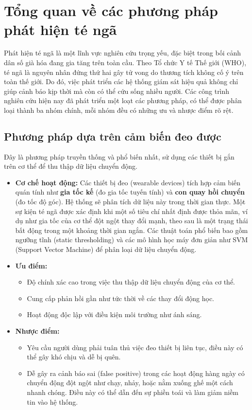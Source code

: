
\section{Tổng quan về các phương pháp phát hiện té ngã}

Phát hiện té ngã là một lĩnh vực nghiên cứu trọng yếu, đặc biệt trong bối cảnh dân số già hóa đang gia tăng trên toàn cầu. Theo Tổ chức Y tế Thế giới (WHO), té ngã là nguyên nhân đứng thứ hai gây tử vong do thương tích không cố ý trên toàn thế giới. Do đó, việc phát triển các hệ thống giám sát hiệu quả không chỉ giúp cảnh báo kịp thời mà còn có thể cứu sống nhiều người. Các công trình nghiên cứu hiện nay đã phát triển một loạt các phương pháp, có thể được phân loại thành ba nhóm chính, mỗi nhóm đều có những ưu và nhược điểm rõ rệt.

\subsection{Phương pháp dựa trên cảm biến đeo được}

Đây là phương pháp truyền thống và phổ biến nhất, sử dụng các thiết bị gắn trên cơ thể để thu thập dữ liệu chuyển động.
\begin{itemize}
    \item \textbf{Cơ chế hoạt động:} Các thiết bị đeo (wearable devices) tích hợp cảm biến quán tính như \textbf{gia tốc kế} (đo gia tốc tuyến tính) và \textbf{con quay hồi chuyển} (đo tốc độ góc). Hệ thống sẽ phân tích dữ liệu này trong thời gian thực. Một sự kiện té ngã được xác định khi một số tiêu chí nhất định được thỏa mãn, ví dụ như gia tốc của cơ thể đột ngột thay đổi mạnh, theo sau là một trạng thái bất động trong một khoảng thời gian ngắn. Các thuật toán phổ biến bao gồm ngưỡng tĩnh (static thresholding) và các mô hình học máy đơn giản như SVM (Support Vector Machine) để phân loại dữ liệu chuyển động.
    \item \textbf{Ưu điểm:} 
    \begin{itemize}
        \item Độ chính xác cao trong việc thu thập dữ liệu chuyển động của cơ thể.
        \item Cung cấp phản hồi gần như tức thời về các thay đổi động học.
        \item Hoạt động độc lập với điều kiện môi trường như ánh sáng.
    \end{itemize}
    \item \textbf{Nhược điểm:}
    \begin{itemize}
        \item Yêu cầu người dùng phải tuân thủ việc đeo thiết bị liên tục, điều này có thể gây khó chịu và dễ bị quên.
        \item Dễ gây ra cảnh báo sai (false positive) trong các hoạt động hàng ngày có chuyển động đột ngột như chạy, nhảy, hoặc nằm xuống ghế một cách nhanh chóng. Điều này có thể dẫn đến sự phiền toái và làm giảm niềm tin vào hệ thống.
    \end{itemize}
\end{itemize}

